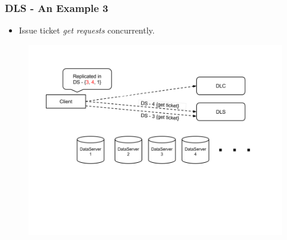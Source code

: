 \documentclass{beamer}
\begin{document}
\begin{frame}
  \frametitle{DLS - An Example 3}
  \begin{itemize}
  \item Issue ticket \textit{get requests} concurrently.
\newline
  \end{itemize}
  \begin{figure}
    \begin{center}
      \centerline{\includegraphics[scale=0.40]{img/DLS_Example4.png}}
    \end{center}
  \end{figure}

\end{frame}
\end{document}
